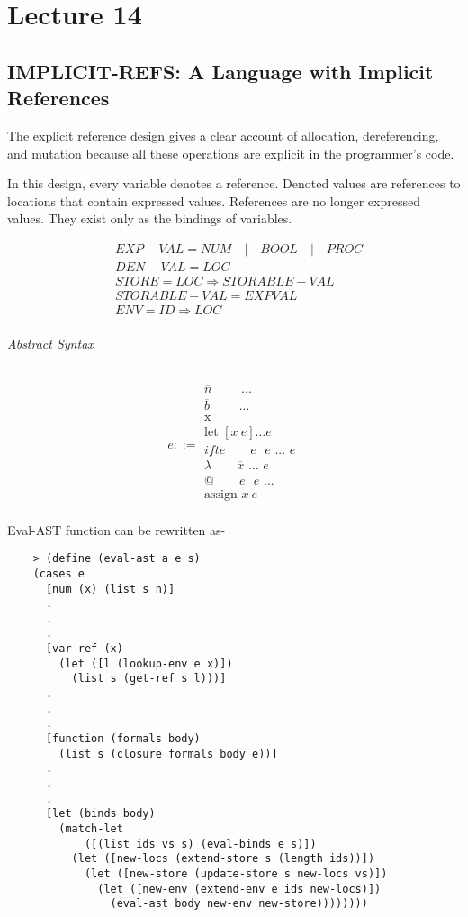 \chapter{Lecture 14}

\section{IMPLICIT-REFS: A Language with Implicit References}

The explicit reference design gives a clear account of allocation, dereferencing, and mutation because all these operations are explicit in the programmer’s code.

In this design, every variable denotes a reference. Denoted values are references to locations that contain expressed values. References are no longer
expressed values. They exist only as the bindings of variables.

\begin{align*}
    & EXP-VAL = NUM \quad | \quad BOOL \quad | \quad PROC \\
    & DEN-VAL = LOC \\
    & STORE = LOC \Rightarrow STORABLE-VAL \\
    & STORABLE-VAL = EXPVAL \\
    & ENV = ID \Rightarrow LOC
\end{align*}

\subparagraph{Abstract Syntax}
\[
e ::=
\begin{array}{ll}
    \overline{n} \qquad \text{ ... }\\
    \overline{b} \qquad\text{ ... }\\
    \text{x } \\
    \text{let } [x\ e] \ldots e\\
    ifte \qquad e \text{ } e \text{ ... } e\\
    \lambda \qquad \overline{x} \text{ ... }e\\    
    @ \qquad e \text{ } e \text{ ...}\\
    \text{assign } x\ e\\ 
\end{array}
\]

Eval-AST function can be rewritten as-
\begin{verbatim}
    > (define (eval-ast a e s)
    (cases e
      [num (x) (list s n)]
      .
      .
      .
      [var-ref (x)
        (let ([l (lookup-env e x)])
          (list s (get-ref s l)))]
      .
      .
      .
      [function (formals body)
        (list s (closure formals body e))]
      .
      .
      .
      [let (binds body)
        (match-let 
            ([(list ids vs s) (eval-binds e s)])
          (let ([new-locs (extend-store s (length ids))])
            (let ([new-store (update-store s new-locs vs)])
              (let ([new-env (extend-env e ids new-locs)])
                (eval-ast body new-env new-store))))))))
\end{verbatim}


